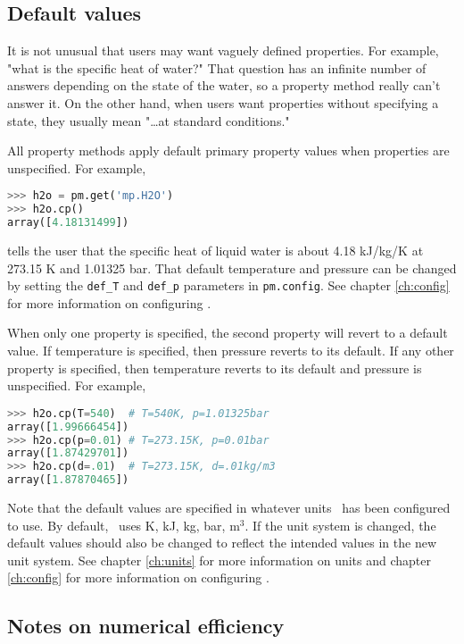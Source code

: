 \subsection{Default values}

It is not unusual that users may want vaguely defined properties.  For example, "what is the specific heat of water?"  That question has an infinite number of answers depending on the state of the water, so a property method really can't answer it.  On the other hand, when users want properties without specifying a state, they usually mean "\ldots at standard conditions."

All property methods apply default primary property values when properties are unspecified.  For example,
\begin{lstlisting}[language=Python]
>>> h2o = pm.get('mp.H2O')
>>> h2o.cp()
array([4.18131499])
\end{lstlisting}
tells the user that the specific heat of liquid water is about 4.18 kJ/kg/K at 273.15 K and 1.01325 bar.  That default temperature and pressure can be changed by setting the \verb|def_T| and \verb|def_p| parameters in \texttt{pm.config}.  See chapter \ref{ch:config} for more information on configuring \PM.

When only one property is specified, the second property will revert to a default value.  If temperature is specified, then pressure reverts to its default.  If any other property is specified, then temperature reverts to its default and pressure is unspecified.  For example,
\begin{lstlisting}[language=Python]
>>> h2o.cp(T=540)  # T=540K, p=1.01325bar
array([1.99666454])
>>> h2o.cp(p=0.01) # T=273.15K, p=0.01bar
array([1.87429701])
>>> h2o.cp(d=.01)  # T=273.15K, d=.01kg/m3
array([1.87870465])
\end{lstlisting}

Note that the default values are specified in whatever units \PM\ has been configured to use.  By default, \PM\ uses K, kJ, kg, bar, m$^3$.  If the unit system is changed, the default values should also be changed to reflect the intended values in the new unit system.  See chapter \ref{ch:units} for more information on units and chapter \ref{ch:config} for more information on configuring \PM.

\subsection{Notes on numerical efficiency}

